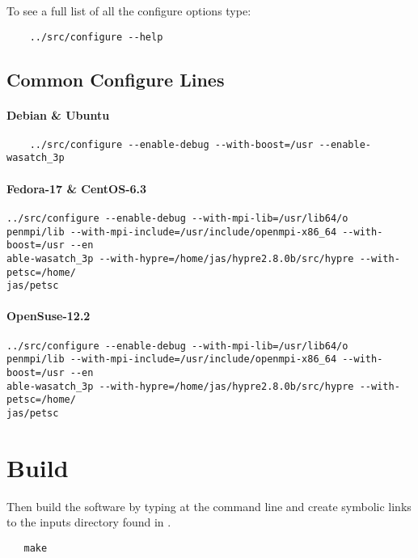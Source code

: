 \documentclass[11pt,fleqn]{book} %
\begin{document}
To see a full list of all the configure options type:

\begin{lstlisting}
    ../src/configure --help
\end{lstlisting}

\subsection{Common Configure Lines}

\paragraph{Debian \& Ubuntu}

\begin{lstlisting}
    ../src/configure --enable-debug --with-boost=/usr --enable-wasatch_3p
\end{lstlisting}

\paragraph{Fedora-17 \& CentOS-6.3}

\begin{lstlisting}
../src/configure --enable-debug --with-mpi-lib=/usr/lib64/o
penmpi/lib --with-mpi-include=/usr/include/openmpi-x86_64 --with-boost=/usr --en
able-wasatch_3p --with-hypre=/home/jas/hypre2.8.0b/src/hypre --with-petsc=/home/
jas/petsc
\end{lstlisting}

\paragraph{OpenSuse-12.2}

\begin{lstlisting}
../src/configure --enable-debug --with-mpi-lib=/usr/lib64/o
penmpi/lib --with-mpi-include=/usr/include/openmpi-x86_64 --with-boost=/usr --en
able-wasatch_3p --with-hypre=/home/jas/hypre2.8.0b/src/hypre --with-petsc=/home/
jas/petsc
\end{lstlisting}

\section{Build}

Then build the software by typing  at the command line and create symbolic links to the inputs directory found in .
\begin{lstlisting}
   make
\end{lstlisting}
\end{document}
